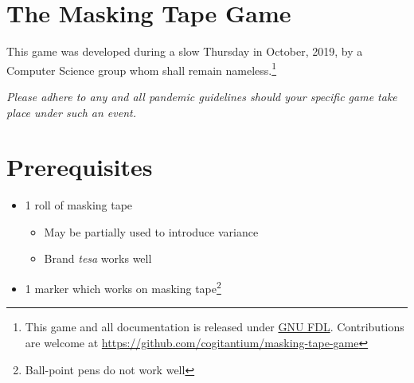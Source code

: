 \documentclass[12pt, a4paper]{article}
\begin{document}
\section{The Masking Tape Game}
This game was developed during a slow Thursday in October, 2019, by a Computer Science group whom shall remain nameless.\footnote{This game and all documentation is released under \href{https://www.gnu.org/licenses/fdl.tex}{GNU FDL}. Contributions are welcome at \url{https://github.com/cogitantium/masking-tape-game}}

\begin{center}
    \textit{Please adhere to any and all pandemic guidelines should your specific game take place under such an event.}
\end{center}

\section{Prerequisites}
\begin{itemize}
    \item 1 roll of masking tape
    \begin{itemize}
        \item May be partially used to introduce variance
        \item Brand \textit{tesa\textsuperscript{\textregistered}} works well
    \end{itemize}
    \item 1 marker which works on masking tape\footnote{Ball-point pens do not work well}
\end{itemize}
\end{document}
